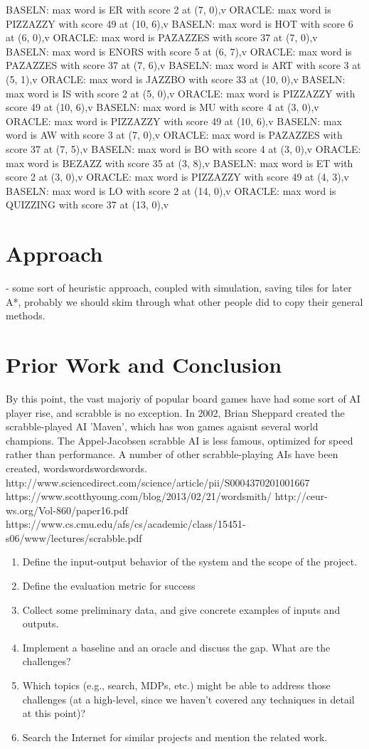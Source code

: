 \documentclass[12pt]{article}
\begin{document}
BASELN: max word is ER with score 2 at (7, 0),v
ORACLE: max word is PIZZAZZY with score 49 at (10, 6),v
BASELN: max word is HOT with score 6 at (6, 0),v
ORACLE: max word is PAZAZZES with score 37 at (7, 0),v
BASELN: max word is ENORS with score 5 at (6, 7),v
ORACLE: max word is PAZAZZES with score 37 at (7, 6),v
BASELN: max word is ART with score 3 at (5, 1),v
ORACLE: max word is JAZZBO with score 33 at (10, 0),v
BASELN: max word is IS with score 2 at (5, 0),v
ORACLE: max word is PIZZAZZY with score 49 at (10, 6),v
BASELN: max word is MU with score 4 at (3, 0),v
ORACLE: max word is PIZZAZZY with score 49 at (10, 6),v
BASELN: max word is AW with score 3 at (7, 0),v
ORACLE: max word is PAZAZZES with score 37 at (7, 5),v
BASELN: max word is BO with score 4 at (3, 0),v
ORACLE: max word is BEZAZZ with score 35 at (3, 8),v
BASELN: max word is ET with score 2 at (3, 0),v
ORACLE: max word is PIZZAZZY with score 49 at (4, 3),v
BASELN: max word is LO with score 2 at (14, 0),v
ORACLE: max word is QUIZZING with score 37 at (13, 0),v

\section*{Approach}
- some sort of heuristic approach, coupled with simulation, saving tiles for later 
A*, probably we should skim through what other people did to copy their general methods.

\section*{Prior Work and Conclusion}

By this point, the vast majoriy of popular board games have had some sort of AI player rise, and scrabble is no exception. In 2002, Brian Sheppard created the scrabble-played AI 'Maven', which has won games agaisnt several world champions.  The Appel-Jacobsen scrabble AI is less famous, optimized for speed rather than performance.  A number of other scrabble-playing AIs have been created, wordswordswordswords. 
http://www.sciencedirect.com/science/article/pii/S0004370201001667
https://www.scotthyoung.com/blog/2013/02/21/wordsmith/
http://ceur-ws.org/Vol-860/paper16.pdf
https://www.cs.cmu.edu/afs/cs/academic/class/15451-s06/www/lectures/scrabble.pdf

\begin{enumerate}[label=(\roman*)]
  \item  Define the input-output behavior of the system and the scope of the project.
  \item  Define the evaluation metric for success
  \item  Collect some preliminary data, and give concrete examples of inputs and outputs.
  \item  Implement a baseline and an oracle and discuss the gap. What are the challenges?
  \item Which topics (e.g., search, MDPs, etc.) might be able to address those challenges (at a high-level, since we haven't covered any techniques in detail at this point)?
  \item  Search the Internet for similar projects and mention the related work.
\end{enumerate}
\end{document}
